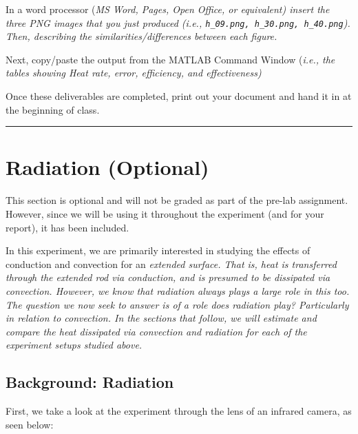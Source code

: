 \documentclass[11pt, letterpaper]{article}
\begin{document}
\begin{formal}
    \begin{deliv}  
In a word processor (\it{MS Word, Pages, Open Office, or equivalent}) insert the three PNG images that you just produced  (\it{i.e.,} \texttt{h\_09.png, h\_30.png, h\_40.png}).  Then,  describing the similarities/differences between each figure.
    \end{deliv}
\end{formal}

\begin{formal}
    \begin{deliv}  
Next, copy/paste the output from the MATLAB Command Window  (\it{i.e.,} the tables showing Heat rate, error, efficiency, and effectiveness)
    \end{deliv}
\end{formal}

Once these deliverables are completed, print out your document and hand it in at the beginning of class.

\n
\hrule

\section{Radiation (Optional)}

This section is optional and will not be graded as part of the pre-lab assignment. However, since we will be using it throughout the experiment (and for your report), it has been included. 
\n

In this experiment, we are primarily interested in studying the effects of conduction and convection for an \it{extended surface}. That is, heat is transferred through the extended rod via conduction, and is presumed to be dissipated via convection. However, we know that radiation always plays a large role in this too. The question we now seek to answer is  of a role does radiation play? Particularly in relation to \it{convection}. In the sections that follow, we will estimate and compare the heat dissipated via convection and radiation for each of the experiment setups studied above.

\n
\subsection{Background: Radiation}

First, we take a look at the experiment through the lens of an infrared camera, as seen below:
\end{document}
